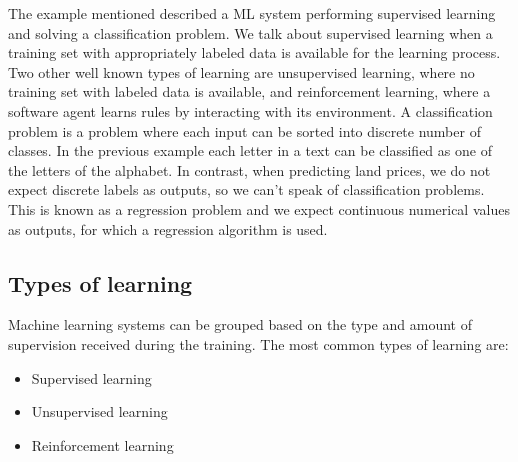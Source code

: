 \documentclass[a4paper,oneside,onecolumn,12pt]{LegrandOrangeBook}
\begin{document}
	The example mentioned described a ML system performing supervised learning and solving a classification problem. We talk about supervised learning when a training set with appropriately labeled data is available for the learning process. Two other well known types of learning are unsupervised learning, where no training set with labeled data is available, and reinforcement learning, where a software agent learns rules by interacting with its environment. A classification problem is a problem where each input can be sorted into discrete number of classes. In the previous example each letter in a text can be classified as one of the letters of the alphabet. In contrast, when predicting land prices, we do not expect discrete labels as outputs, so we can't speak of classification problems. This is known as a regression problem and we expect continuous numerical values as outputs, for which a regression algorithm is used.

		\subsection{Types of learning}
		Machine learning systems can be grouped based on the type and amount of supervision received during the training. The most common types of learning are:
		\begin{itemize}[noitemsep]
			\item Supervised learning
			\item Unsupervised learning
			\item Reinforcement learning
		\end{itemize}
		\cite{HMLSKT}
			
\end{document}
